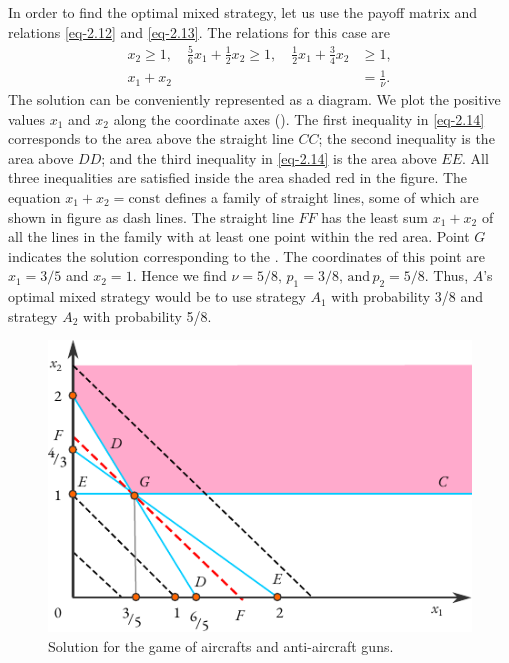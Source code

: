 In order to find the optimal mixed strategy, let us use the payoff
matrix and relations \eqref{eq-2.12} and \eqref{eq-2.13}. The relations for this case are
\begin{align}%
 x_{2} \geqslant 1, \quad \frac{5}{6}x_{1} + \frac{1}{2} x_{2}  \geqslant 1, \quad  \frac{1}{2}x_{1} + \frac{3}{4} x_{2} & \geqslant 1 \label{eq-2.14},\\
x_{1} + x_{2} & = \frac{1}{\nu}. \label{eq-2.15}
\end{align}
The solution can be conveniently represented as a diagram. We plot
the positive values $x_{1}$ and $x_{2}$ along the coordinate axes (). The first inequality in \eqref{eq-2.14} corresponds to the area above the straight line $CC$; the second inequality is the area above $DD$; and the third inequality in \eqref{eq-2.14} is the area above $EE$. All three inequalities are satisfied inside the area shaded red in the figure. The equation $x_{1} + x_{2} = \text{const}$ defines a family of straight lines, some of which are shown in figure as dash lines. The straight line $FF$ has the least sum $x_{1} + x_{2}$ of all the lines in the family with at least one point within the red area. Point
$G$ indicates the solution corresponding to the .
The coordinates of this point are  $x_{1} = 3/5$ and  $x_{2} = 1$. Hence we find
$\nu = 5/8, \, p_{1} = 3/8, \, \text{and} \, p_{2} = 5/8$. Thus, $A$'s optimal mixed strategy would be to use strategy $A_{1}$ with probability 3/8 and strategy $A_{2}$ with probability 5/8.
 \begin{figure}[!h]
 \centering
 \includegraphics[width=0.85\tfwidth]{figures/aa-graph.pdf}
\caption{Solution for the game of aircrafts and anti-aircraft guns.\label{aa-graph}}
 \end{figure}

